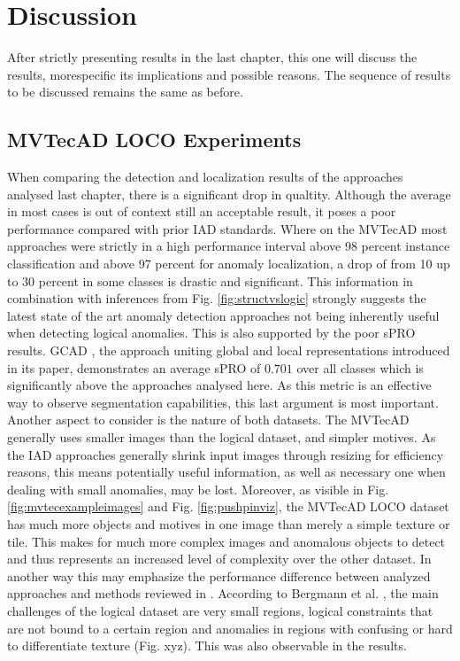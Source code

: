 \chapter{Discussion}
\label{chap:results}

After strictly presenting results in the last chapter, this one will discuss the results, morespecific its implications and possible reasons. 
The sequence of results to be discussed remains the same as before.


\section{MVTecAD LOCO Experiments}
\label{sec:locoresultssota}

When comparing the detection and localization results of the approaches analysed last chapter, there is a significant drop in qualtity. 
Although the average in most cases is out of context still an acceptable result, it poses a poor performance compared with prior 
IAD standards. Where on the MVTecAD \cite{MVTEC_Bergmann_2021} most approaches were strictly in a high performance interval above 98 percent 
instance classification and above 97 percent for anomaly localization, a drop of from 10 up to 30 percent in some classes is drastic and significant. 
This information in combination with inferences from Fig. \ref{fig:structvslogic} strongly suggests the latest state of 
the art anomaly detection approaches not being inherently useful when detecting logical anomalies. This is also supported by the 
poor sPRO results. GCAD \cite{LOCODentsAndScratchesBergmann2022}, the approach uniting global and local representations introduced in its 
paper, demonstrates an average sPRO of $0.701$ over all classes which is significantly above the approaches analysed here. As this metric 
is an effective way to observe segmentation capabilities, this last argument is most important. \newline
Another aspect to consider is the nature of both datasets. The MVTecAD \cite{MVTEC_Bergmann_2021} generally uses smaller images than the 
logical dataset, and simpler motives. As the IAD approaches generally shrink input images through resizing for efficiency reasons, 
this means potentially useful information, as well as necessary one when dealing with small anomalies, may be lost. 
Moreover, as visible in Fig. \ref{fig:mvtecexampleimages} and Fig. \ref{fig:pushpinviz}, the MVTecAD LOCO dataset 
has much more objects and motives in one image than merely a simple texture or tile. This makes for much more complex images and anomalous objects 
to detect and thus represents an increased level of complexity over the other dataset. In another way this may emphasize the performance 
difference between analyzed approaches and methods reviewed in \cite{LOCODentsAndScratchesBergmann2022}. \newline
According to Bergmann et al. \cite{LOCODentsAndScratchesBergmann2022}, the main challenges of the logical dataset are very small regions, logical constraints that are 
not bound to a certain region and anomalies in regions with confusing or hard to differentiate texture (Fig. xyz). This was also observable in the results.

